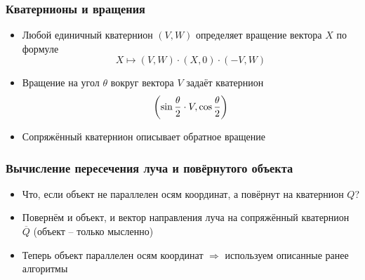 \documentclass[10pt,handout]{beamer}
\begin{document}
\begin{frame}
\frametitle{Кватернионы и вращения}
\begin{itemize}
\item Любой единичный кватернион \begin{math}(V,W)\end{math} определяет вращение вектора \begin{math}X\end{math} по формуле
\begin{equation}
X \mapsto (V, W) \cdot (X, 0) \cdot (-V, W)
\end{equation}
\pause
\item Вращение на угол \begin{math}\theta\end{math} вокруг вектора \begin{math}V\end{math} задаёт кватернион
\begin{equation}
\left(\sin{\theta\over 2} \cdot V, \cos{\theta\over 2}\right)
\end{equation}
\pause
\item Сопряжённый кватернион описывает обратное вращение
\end{itemize}
\end{frame}

\begin{frame}
\frametitle{Вычисление пересечения луча и повёрнутого объекта}
\begin{itemize}
\item Что, если объект не параллелен осям координат, а повёрнут на кватернион \begin{math}Q\end{math}?
\pause
\item Повернём и объект, и вектор направления луча на сопряжённый кватернион \begin{math}\overline{Q}\end{math} (объект -- только мысленно)
\pause
\item Теперь объект параллелен осям координат \begin{math}\Longrightarrow\end{math} используем описанные ранее алгоритмы
\end{itemize}
\end{frame}
\end{document}

